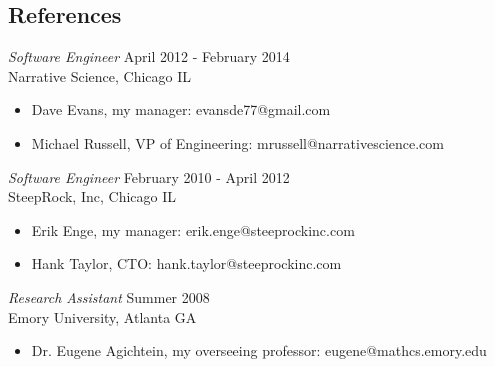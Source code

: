 \documentclass[line,margin]{res}
\begin{document}
\address{waltaskew@gmail.com}
\address{404-819-9796}

\begin{resume}
 
\section{References}
        {\sl Software Engineer} \hfill April 2012 - February 2014 \\
        Narrative Science, Chicago IL
        \begin{itemize} 
          \item Dave Evans, my manager: evansde77@gmail.com
          \item Michael Russell, VP of Engineering: mrussell@narrativescience.com
        \end{itemize}

        {\sl Software Engineer} \hfill February 2010 - April 2012 \\
        SteepRock, Inc, Chicago IL
        \begin{itemize}
          \item Erik Enge, my manager: erik.enge@steeprockinc.com
          \item Hank Taylor, CTO: hank.taylor@steeprockinc.com
        \end{itemize}

        {\sl Research Assistant} \hfill Summer 2008 \\
        Emory University, Atlanta GA
        \begin{itemize}
          \item Dr. Eugene Agichtein, my overseeing professor: eugene@mathcs.emory.edu
        \end{itemize}

\end{resume}
\end{document}
